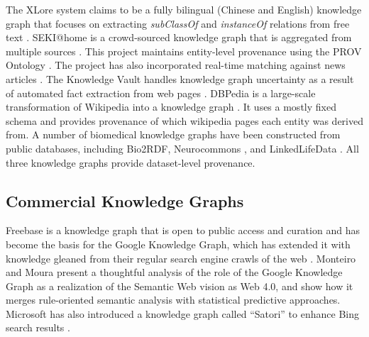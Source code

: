 The XLore system claims to be a fully bilingual (Chinese and English) knowledge graph that focuses on extracting \emph{subClassOf} and \emph{instanceOf} relations from free text \cite{wang2013xlore}.
SEKI@home is a crowd-sourced knowledge graph that is aggregated from multiple sources \cite{steiner2012seki}.
This project maintains entity-level provenance using the PROV Ontology \cite{Moreau_2015}.
The project has also incorporated real-time matching against news articles \cite{steiner_iswc_2012}.
The Knowledge Vault handles knowledge graph uncertainty as a result of automated fact extraction from web pages \cite{Dong_2014}.
DBPedia is a large-scale transformation of Wikipedia into a knowledge graph \cite{Bizer_2009}.
It uses a mostly fixed schema and provides provenance of which wikipedia pages each entity was derived from.
A number of biomedical knowledge graphs have been constructed from public databases, including Bio2RDF\cite{Callahan_2013}, Neurocommons \cite{Ruttenberg_2009}, and LinkedLifeData \cite{momtchev2009expanding}.
All three knowledge graphs provide dataset-level provenance.

\subsection{Commercial Knowledge Graphs}
Freebase is a knowledge graph that is open to public access and curation \cite{Bollacker_2008} and has become the basis for the Google Knowledge Graph, which has extended it with knowledge gleaned from their regular search engine crawls of the web \cite{singhal2012introducing}.
Monteiro and Moura \cite{10110943220141101} present a thoughtful analysis of the role of the Google Knowledge Graph as a realization of the Semantic Web vision \cite{bernerslee2000semantic} as Web 4.0, and show how it merges rule-oriented semantic analysis with statistical predictive approaches.
Microsoft has also introduced a knowledge graph called ``Satori'' to enhance Bing search results \cite{qian2013understand}.

